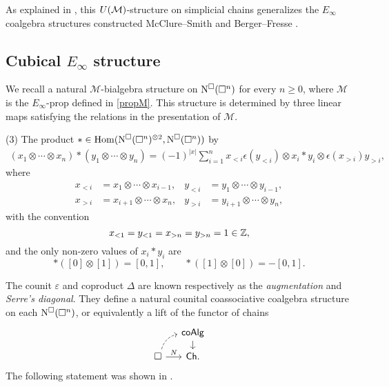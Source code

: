 As explained in \cite{medina2020prop1}, this $U(\mathcal{M})$-structure on simplicial chains generalizes the $E_\infty$ coalgebra structures constructed McClure--Smith \cite{mcclure2003multivariable} and Berger--Fresse \cite{berger2004combinatorial}.

\subsection{Cubical $E_\infty$ structure}

We recall a natural $\mathcal M$-bialgebra structure on $\operatorname{N^{\square}}(\square^n)$ for every $n \geq 0$, where $\mathcal M$ is the $E_{\infty}$-prop defined in \ref{propM}. This structure is determined by three linear maps satisfying the relations in the presentation of $\mathcal M$.


(3) The product $\ast \in \mathrm{Hom}(\operatorname{N^{\square}}(\square^n)^{\otimes 2}, \operatorname{N^{\square}}(\square^n))$ by
\begin{align*}
(x_1 \otimes \cdots \otimes x_n) \ast (y_1 \otimes \cdots \otimes y_n) =
(-1)^{|x|} \sum_{i=1}^n x_{<i} \epsilon(y_{<i}) \otimes x_i \ast y_i \otimes \epsilon(x_{>i})y_{>i},
\end{align*}
where
\begin{align*}
x_{<i} & = x_1 \otimes \cdots \otimes x_{i-1}, &
y_{<i} & = y_1 \otimes \cdots \otimes y_{i-1}, \\
x_{>i} & = x_{i+1} \otimes \cdots \otimes x_n, & 
y_{>i} & = y_{i+1} \otimes \cdots \otimes y_n,
\end{align*}
with the convention
\begin{equation*}
x_{<1} = y_{<1} = x_{>n} = y_{>n} = 1 \in \mathbb{Z},
\end{equation*}
and the only non-zero values of $x_i \ast y_i$ are
\begin{equation*}
\ast([0] \otimes [1]) = [0, 1], \qquad  \ast([1] \otimes [0]) = -[0, 1].
\end{equation*}

The counit $\varepsilon$ and coproduct $\Delta$ are known respectively as the \textit{augmentation} and \textit{Serre's diagonal}.
They define a natural counital coassociative coalgebra structure on each $\operatorname{N^{\square}}(\square^n)$, or equivalently a lift of the functor of chains
\begin{equation} \label{e:Serre lift}
\begin{tikzcd}[column sep=small, row sep=small]
& \coAlg \arrow[d] \\
\cube \arrow[r, "N"] \arrow[dashed, ur, bend left]& \Ch.
\end{tikzcd}
\end{equation}
The following statement was shown in \cite{medina2021cubical}.

